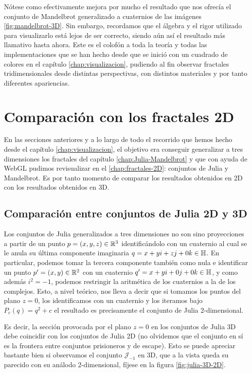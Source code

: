 Nótese como efectivamente mejora por mucho el resultado que nos ofrecía el conjunto de Mandelbrot generalizado a cuaternios de las imágenes \ref{fig:mandelbrot-3D}. Sin embargo, recordamos que el álgebra y el rigor utilizado para visualizarlo está lejos de ser correcto, siendo aún así el resultado más llamativo hasta ahora. Este es el colofón a toda la teoría y todas las implementaciones que se han hecho desde que se inició con un cuadrado de colores en el capítulo \ref{chap:visualizacion}, pudiendo al fin observar fractales tridimensionales desde distintas perspectivas, con distintos materiales y por tanto diferentes apariencias.


\section{Comparación con los fractales 2D}

En las secciones anteriores y a lo largo de todo el recorrido que hemos hecho desde el capítulo \ref{chap:visualizacion}, el objetivo era conseguir generalizar a tres dimensiones los fractales del capítulo \ref{chap:Julia-Mandelbrot} y que con ayuda de WebGL pudimos revisualizar en el \ref{chap:fractales-2D}: conjuntos de Julia y Mandelbrot. Es por tanto momento de comparar los resultados obtenidos en 2D con los resultados obtenidos en 3D.

\subsection{Comparación entre conjuntos de Julia 2D y 3D}

Los conjuntos de Julia generalizados a tres dimensiones no son sino proyecciones a partir de un punto $p=(x,y,z)\in\mathbb{R}^3$ identificándolo con un cuaternio al cual se le anula su última componente imaginaria $q=x + yi +zj + 0k\in\mathbb{H}$. En particular, podemos tomar la tercera componente también como nula e identificar un punto $p'=(x,y)\in\mathbb{R}^2$ con un cuaternio $q'=x + yi + 0j + 0k\in\mathbb{H}$, y como además $i^2=-1$, podemos restringir la aritmética de los cuaternios a la de los complejos. Esto, a nivel teórico, nos lleva a decir que si tomamos los puntos del plano $z=0$, los identificamos con un cuaternio y los iteramos bajo $P_c(q)=q^2+c$ el resultado es precisamente el conjunto de Julia 2-dimensional.

Es decir, la sección provocada por el plano $z=0$ en los conjuntos de Julia 3D debe coincidir con los conjuntos de Julia 2D (no olvidemos que el conjunto en sí es la frontera entre conjuntos prisioneros y de escape). Esto se puede apreciar bastante bien si observamos el conjunto $\mathcal{J}_{-1}$ en 3D, que a la vista queda su parecido con su análodo 2-dimensional, fíjese en la figura \ref{fig:julia-3D-2D}.


